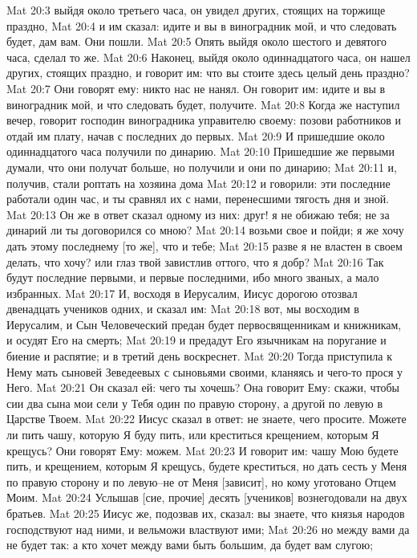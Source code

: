 Mat 20:3  выйдя около третьего часа, он увидел других, стоящих на торжище праздно,
Mat 20:4  и им сказал: идите и вы в виноградник мой, и что следовать будет, дам вам. Они пошли.
Mat 20:5  Опять выйдя около шестого и девятого часа, сделал то же.
Mat 20:6  Наконец, выйдя около одиннадцатого часа, он нашел других, стоящих праздно, и говорит им: что вы стоите здесь целый день праздно?
Mat 20:7  Они говорят ему: никто нас не нанял. Он говорит им: идите и вы в виноградник мой, и что следовать будет, получите.
Mat 20:8  Когда же наступил вечер, говорит господин виноградника управителю своему: позови работников и отдай им плату, начав с последних до первых.
Mat 20:9  И пришедшие около одиннадцатого часа получили по динарию.
Mat 20:10  Пришедшие же первыми думали, что они получат больше, но получили и они по динарию;
Mat 20:11  и, получив, стали роптать на хозяина дома
Mat 20:12  и говорили: эти последние работали один час, и ты сравнял их с нами, перенесшими тягость дня и зной.
Mat 20:13  Он же в ответ сказал одному из них: друг! я не обижаю тебя; не за динарий ли ты договорился со мною?
Mat 20:14  возьми свое и пойди; я же хочу дать этому последнему [то же], что и тебе;
Mat 20:15  разве я не властен в своем делать, что хочу? или глаз твой завистлив оттого, что я добр?
Mat 20:16  Так будут последние первыми, и первые последними, ибо много званых, а мало избранных.
Mat 20:17  И, восходя в Иерусалим, Иисус дорогою отозвал двенадцать учеников одних, и сказал им:
Mat 20:18  вот, мы восходим в Иерусалим, и Сын Человеческий предан будет первосвященникам и книжникам, и осудят Его на смерть;
Mat 20:19  и предадут Его язычникам на поругание и биение и распятие; и в третий день воскреснет.
Mat 20:20  Тогда приступила к Нему мать сыновей Зеведеевых с сыновьями своими, кланяясь и чего-то прося у Него.
Mat 20:21  Он сказал ей: чего ты хочешь? Она говорит Ему: скажи, чтобы сии два сына мои сели у Тебя один по правую сторону, а другой по левую в Царстве Твоем.
Mat 20:22  Иисус сказал в ответ: не знаете, чего просите. Можете ли пить чашу, которую Я буду пить, или креститься крещением, которым Я крещусь? Они говорят Ему: можем.
Mat 20:23  И говорит им: чашу Мою будете пить, и крещением, которым Я крещусь, будете креститься, но дать сесть у Меня по правую сторону и по левую--не от Меня [зависит], но кому уготовано Отцем Моим.
Mat 20:24  Услышав [сие, прочие] десять [учеников] вознегодовали на двух братьев.
Mat 20:25  Иисус же, подозвав их, сказал: вы знаете, что князья народов господствуют над ними, и вельможи властвуют ими;
Mat 20:26  но между вами да не будет так: а кто хочет между вами быть большим, да будет вам слугою;
